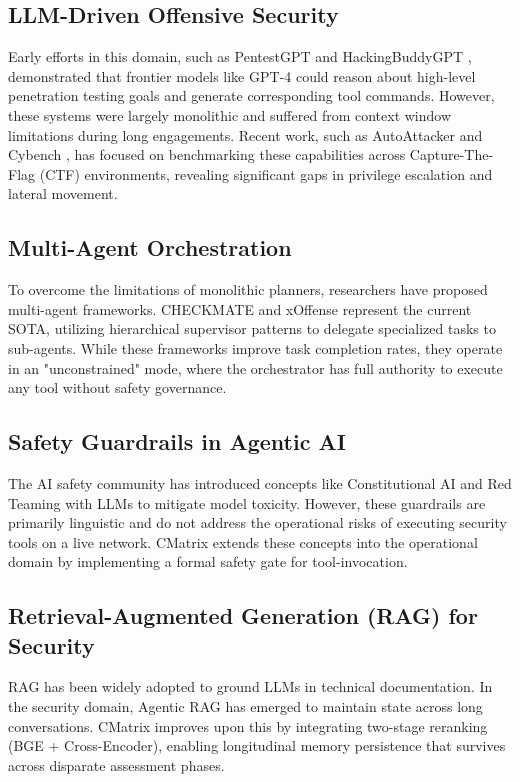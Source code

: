 \documentclass[conference]{IEEEtran}
\begin{document}
\subsection{LLM-Driven Offensive Security}
Early efforts in this domain, such as PentestGPT \cite{pentestgpt} and HackingBuddyGPT \cite{hackingbuddygpt}, demonstrated that frontier models like GPT-4 could reason about high-level penetration testing goals and generate corresponding tool commands. However, these systems were largely monolithic and suffered from context window limitations during long engagements. Recent work, such as AutoAttacker \cite{autoattacker} and Cybench \cite{cybench}, has focused on benchmarking these capabilities across Capture-The-Flag (CTF) environments, revealing significant gaps in privilege escalation and lateral movement.

\subsection{Multi-Agent Orchestration}
To overcome the limitations of monolithic planners, researchers have proposed multi-agent frameworks. CHECKMATE \cite{checkmate2025} and xOffense \cite{xoffense2025} represent the current SOTA, utilizing hierarchical supervisor patterns to delegate specialized tasks to sub-agents. While these frameworks improve task completion rates, they operate in an "unconstrained" mode, where the orchestrator has full authority to execute any tool without safety governance.

\subsection{Safety Guardrails in Agentic AI}
The AI safety community has introduced concepts like Constitutional AI \cite{constitutionalai} and Red Teaming with LLMs \cite{perez2022red} to mitigate model toxicity. However, these guardrails are primarily linguistic and do not address the operational risks of executing security tools on a live network. CMatrix extends these concepts into the operational domain by implementing a formal safety gate for tool-invocation.

\subsection{Retrieval-Augmented Generation (RAG) for Security}
RAG \cite{rag} has been widely adopted to ground LLMs in technical documentation. In the security domain, Agentic RAG \cite{selfrag} has emerged to maintain state across long conversations. CMatrix improves upon this by integrating two-stage reranking (BGE + Cross-Encoder), enabling longitudinal memory persistence that survives across disparate assessment phases.
\end{document}
